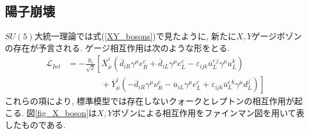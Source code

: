 \subsection{陽子崩壊}
$SU(5)$大統一理論では式(\ref{XY_bosons})で見たように, 新たに$X, Y$ゲージボゾンの存在が予言される.
ゲージ相互作用は次のような形をとる.
\begin{align}
  \mathcal{L}_{Int} &= -\frac{g_5}{\sqrt{2}}\left[ \overline{X}_\mu^i(\overline{d}_{iR}\gamma^\mu e^c_R + \overline{d}_{iL}\gamma^\mu e^c_L -\varepsilon_{ijk} \overline{u}_L^{c\,j}\gamma^\mu u_L^k) \right.\nonumber\\ &\qquad\qquad+\left.\overline{Y}_\mu^i(-\overline{d}_{iR}\gamma^\mu \nu_R^c -\overline{u}_{iL}\gamma^\mu e_L^c + \varepsilon_{ijk}\overline{u}_L^{c\,k}\gamma^\mu d_L^j)\right] \label{PD_L}
\end{align}
これらの項により, 標準模型では存在しないクォークとレプトンの相互作用が起こる.
図\ref{fig_X_boson}は$X, Y$ボゾンによる相互作用をファインマン図を用いて表したものである.
